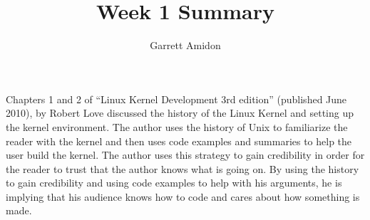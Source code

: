 \documentclass[a4paper]{article}
\title{Week 1 Summary}
\author{Garrett Amidon}
\begin{document}
\maketitle
{}



\paragraph{}

Chapters 1 and 2 of “Linux Kernel Development 3rd edition” (published June 2010), by Robert Love discussed the history of the Linux Kernel and setting up the kernel environment. The author uses the history of Unix to familiarize the reader with the kernel and then uses code examples and summaries to help the user build the kernel. The author uses this strategy to gain credibility in order for the reader to trust that the author knows what is going on. By using the history to gain credibility and using code examples to help with his arguments, he is implying that his audience knows how to code and cares about how something is made.  
\end{document}
